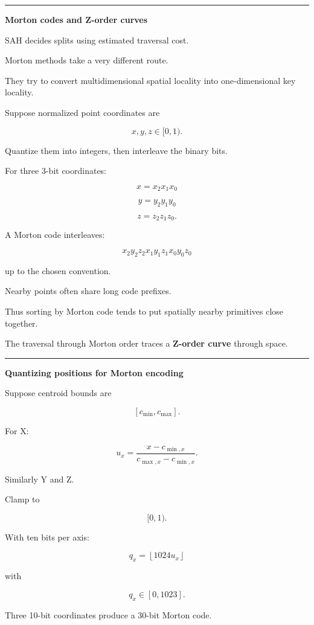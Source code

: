 \begin{center}\rule{0.5\linewidth}{0.5pt}\end{center}

\textbf{Morton codes and Z-order curves}

SAH decides splits using estimated traversal cost.

Morton methods take a very different route.

They try to convert multidimensional spatial locality into one-dimensional key locality.

Suppose normalized point coordinates are

\[
x,y,z\in[0,1).
\]

Quantize them into integers, then interleave the binary bits.

For three 3-bit coordinates:

\[
x=x_2x_1x_0
\]

\[
y=y_2y_1y_0
\]

\[
z=z_2z_1z_0.
\]

A Morton code interleaves:

\[
x_2y_2z_2x_1y_1z_1x_0y_0z_0
\]

up to the chosen convention.

Nearby points often share long code prefixes.

Thus sorting by Morton code tends to put spatially nearby primitives close together.

The traversal through Morton order traces a \textbf{Z-order curve} through space.

\begin{center}\rule{0.5\linewidth}{0.5pt}\end{center}

\textbf{Quantizing positions for Morton encoding}

Suppose centroid bounds are

\[
[c_{\min},c_{\max}].
\]

For X:

\[
u_x=
\frac{x-c_{\min,x}}
{c_{\max,x}-c_{\min,x}}.
\]

Similarly Y and Z.

Clamp to

\[
[0,1).
\]

With ten bits per axis:

\[
q_x=
\left\lfloor1024u_x\right\rfloor
\]

with

\[
q_x\in[0,1023].
\]

Three 10-bit coordinates produce a 30-bit Morton code.

